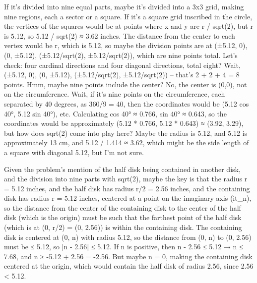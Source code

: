 If it's divided into nine equal parts, maybe it's divided into a 3x3 grid, making nine regions, each a sector or a square. If it's a square grid inscribed in the circle, the vertices of the squares would be at points where x and y are r / sqrt(2), but r is 5.12, so 5.12 / sqrt(2) ≈ 3.62 inches. The distance from the center to each vertex would be r, which is 5.12, so maybe the division points are at (±5.12, 0), (0, ±5.12), (±5.12/sqrt(2), ±5.12/sqrt(2)), which are nine points total. Let's check: four cardinal directions and four diagonal directions, total eight? Wait, (±5.12, 0), (0, ±5.12), (±5.12/sqrt(2), ±5.12/sqrt(2)) – that's 2 + 2 + 4 = 8 points. Hmm, maybe nine points include the center? No, the center is (0,0), not on the circumference. Wait, if it's nine points on the circumference, each separated by 40 degrees, as 360/9 = 40, then the coordinates would be (5.12 cos 40°, 5.12 sin 40°), etc. Calculating cos 40° ≈ 0.766, sin 40° ≈ 0.643, so the coordinates would be approximately (5.12 * 0.766, 5.12 * 0.643) ≈ (3.92, 3.29), but how does sqrt(2) come into play here? Maybe the radius is 5.12, and 5.12 is approximately 13 cm, and 5.12 / 1.414 ≈ 3.62, which might be the side length of a square with diagonal 5.12, but I'm not sure. 

Given the problem's mention of the half disk being contained in another disk, and the division into nine parts with sqrt(2), maybe the key is that the radius r = 5.12 inches, and the half disk has radius r/2 = 2.56 inches, and the containing disk has radius r = 5.12 inches, centered at a point on the imaginary axis (it_n), so the distance from the center of the containing disk to the center of the half disk (which is the origin) must be such that the farthest point of the half disk (which is at (0, r/2) = (0, 2.56)) is within the containing disk. The containing disk is centered at (0, n) with radius 5.12, so the distance from (0, n) to (0, 2.56) must be ≤ 5.12, so |n - 2.56| ≤ 5.12. If n is positive, then n - 2.56 ≤ 5.12 → n ≤ 7.68, and n ≥ -5.12 + 2.56 = -2.56. But maybe n = 0, making the containing disk centered at the origin, which would contain the half disk of radius 2.56, since 2.56 < 5.12. 

